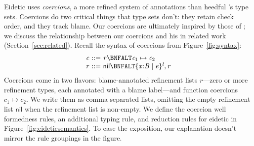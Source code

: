 \documentclass[9pt]{extarticle}
\newcommand{\ottnt}[1]{\mathit{#1}}
\begin{document}
Eidetic \lambdah uses \textit{coercions}\iffull, a more refined system of
annotations than heedful \lambdah's type sets\fi.
Coercions do two critical things\iffull{} that type sets don't\fi: they retain check order,
and they track blame. 
Our coercions are ultimately inspired by those of
\citet{Henglein94dynamic}; we discuss the relationship between
our coercions and his in related work (Section~\ref{sec:related}).
Recall the syntax of coercions from Figure~\ref{fig:syntax}:
\[ \begin{array}{r@{~}c@{~}l}
    \ottnt{c} &::=& \ottnt{r} \BNFALT \ottnt{c_{{\mathrm{1}}}}  \mapsto  \ottnt{c_{{\mathrm{2}}}} \\
    \ottnt{r} &::=&  \mathsf{nil}  \BNFALT   \{ \mathit{x} \mathord{:} \ottnt{B} \mathrel{\mid} \ottnt{e} \}^{ \ottnt{l} }  , \ottnt{r}  \\
\end{array}\]
Coercions come in two flavors: blame-annotated refinement lists
$\ottnt{r}$---zero or more refinement types, each annotated with a blame
label---and function coercions $\ottnt{c_{{\mathrm{1}}}}  \mapsto  \ottnt{c_{{\mathrm{2}}}}$. We write them as comma
separated lists, omitting the empty refinement list $ \mathsf{nil} $ when the
refinement list is non-empty.
We define the coercion well formedness rules, an additional typing
rule, and reduction rules for eidetic \lambdah in
Figure~\ref{fig:eideticsemantics}.
To ease the exposition, our explanation doesn't mirror the rule
groupings in the figure.
\end{document}
